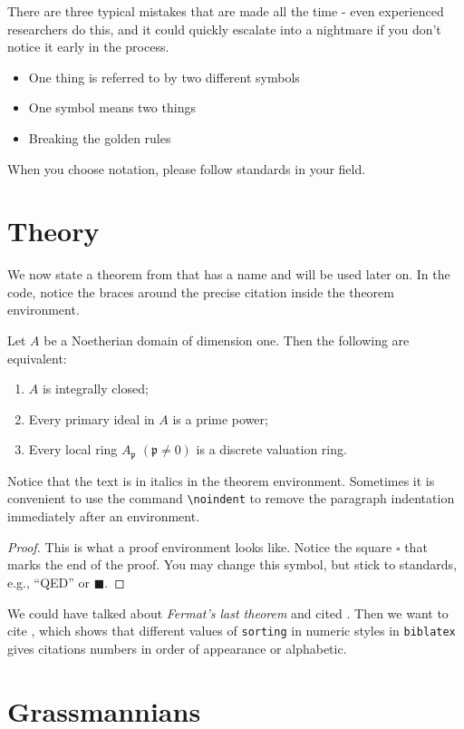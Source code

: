 There are three typical mistakes that are made all the time - even experienced researchers do this, and it could quickly escalate into a nightmare if you don't notice it early in the process.
  \begin{itemize}
      \item One thing is referred to by two different symbols
        \item One symbol means two things
    \item Breaking the golden rules
  \end{itemize}

When you choose notation, please follow standards in your field.



\section{Theory}
We now state a theorem from {\cite{AM69}} that has a name and will be used later on. In the code, notice the braces around the precise citation inside the theorem environment.
\begin{theorem}
    \label{thm:dedekind}
    Let \( A \) be a Noetherian domain of dimension one. Then the following are equivalent:
    \begin{enumerate}[leftmargin=30pt] %
        \item \( A \) is integrally closed;
        \item Every primary ideal in \( A \) is a prime power;
        \item Every local ring \( A_\mathfrak{p} \) \( (\mathfrak{p} \neq 0) \) is a discrete valuation ring.
    \end{enumerate}
\end{theorem}
\noindent Notice that the text is in italics in the theorem environment. Sometimes it is convenient to use the command \texttt{\textbackslash noindent} to remove the paragraph indentation immediately after an environment.
\begin{proof}
This is what a proof environment looks like. Notice the square $\square$ that marks the end of the proof. You may change this symbol, but stick to standards, e.g., \enquote{QED} or $\blacksquare$.
\end{proof}


We could have talked about \emph{Fermat's last theorem} and cited \cite[Theorem~1.1]{Wil93}. Then we want to cite \cite{Vie08}, which shows that different values of \texttt{sorting} in numeric styles in \texttt{biblatex} gives citations numbers in order of appearance or alphabetic.

\section{Grassmannians}

